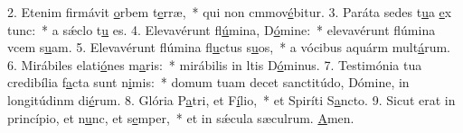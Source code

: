 2. Etenim firmávit \uline{o}rbem t\uline{e}rræ,~* qui non cmmov\uline{é}bitur.
3. Paráta sedes t\uline{u}a \uline{e}x tunc:~* a sǽclo t\uline{u} es.
4. Elevavérunt fl\uline{ú}mina, D\uline{ó}mine:~* elevavérunt flúmina vcem s\uline{u}am.
5. Elevavérunt flúmina fl\uline{u}ctus s\uline{u}os,~* a vócibus aquárm mult\uline{á}rum.
6. Mirábiles elati\uline{ó}nes m\uline{a}ris:~* mirábilis in ltis D\uline{ó}minus.
7. Testimónia tua credibília f\uline{a}cta sunt n\uline{i}mis:~* domum tuam decet sanctitúdo, Dómine, in longitúdinm di\uline{é}rum.
8. Glória P\uline{a}tri, et F\uline{í}lio,~* et Spiríti S\uline{a}ncto.
9. Sicut erat in princípio, et n\uline{u}nc, et s\uline{e}mper,~* et in sǽcula sæculrum. \uline{A}men.
